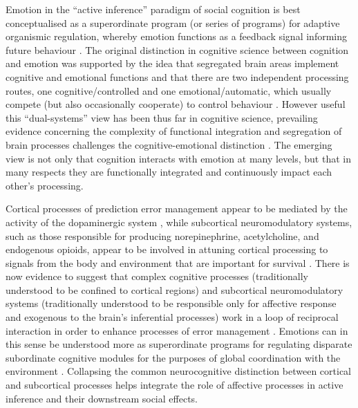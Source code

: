 \begin{CJK}{UTF8}{gbsn}
Emotion in the ``active inference'' paradigm of social cognition is best conceptualised as a superordinate program (or series of programs) for adaptive organismic regulation, whereby emotion functions as a feedback signal informing future behaviour \citep{Cosmides2000,Chetverikov2014,Chetverikov2015,Barrett2017}.  The original distinction in cognitive science between cognition and emotion was supported by the idea that segregated brain areas implement cognitive and emotional functions and that there are two independent processing routes, one cognitive/controlled and one emotional/automatic, which usually compete (but also occasionally cooperate) to control behaviour \citep{Kahneman2003}.  However useful this ``dual-systems'' view has been thus far in cognitive science, prevailing evidence concerning the complexity of functional integration and segregation of brain processes challenges the cognitive-emotional distinction \citep{Pessoa2013}.  The emerging view is not only that cognition interacts with emotion at many levels, but that in many respects they are functionally integrated and continuously impact each other's processing.

Cortical processes of prediction error management appear to be mediated by the activity of the dopaminergic system \citep{Schultz2016}, while subcortical neuromodulatory systems, such as those responsible for producing norepinephrine, acetylcholine, and endogenous opioids, appear to be involved in attuning cortical processing to signals from the body and environment that are important for survival \citep{Lewis2005}.  There is now evidence to suggest that complex cognitive processes (traditionally understood to be confined to cortical regions) and subcortical neuromodulatory systems (traditionally understood to be responsible only for affective response and exogenous to the brain's inferential processes) work in a loop of reciprocal interaction in order to enhance processes of error management \citep{Damasio1994,Lewis2005,Miller2017,Barrett2017}.
Emotions can in this sense be understood more as superordinate programs for regulating disparate subordinate cognitive modules for the purposes of global coordination with the environment \citep{Cosmides2000}.  Collapsing the common neurocognitive distinction between cortical and subcortical processes helps integrate the role of affective processes in active inference and their downstream social effects.


\end{CJK}
